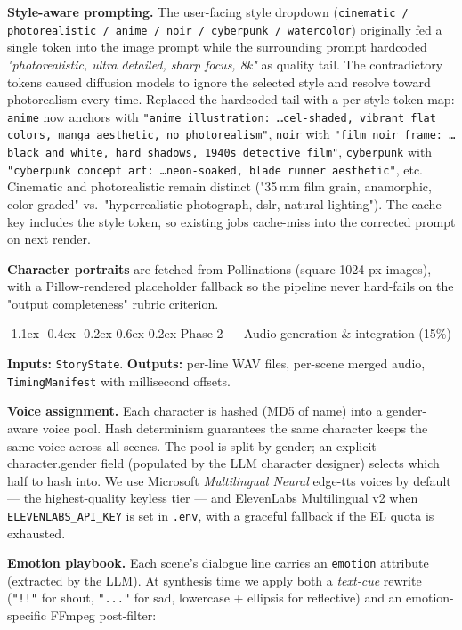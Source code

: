 \documentclass[11pt,a4paper]{article}
\makeatletter
\renewcommand\subsection{\@startsection{subsection}{2}{\z@}%
   {-1.1ex \@plus -0.4ex \@minus -0.2ex}%
   {0.6ex \@plus 0.2ex}%
   {\large\bfseries\color{accent!85!black}}}
\newcommand{\code}[1]{\texttt{\small #1}}
\makeatother
\begin{document}
\textbf{Style-aware prompting.} The user-facing style dropdown
(\code{cinematic / photorealistic / anime / noir / cyberpunk / watercolor})
originally fed a single token into the image prompt while the surrounding
prompt hardcoded \emph{"photorealistic, ultra detailed, sharp focus, 8k"} as
quality tail. The contradictory tokens caused diffusion models to ignore the
selected style and resolve toward photorealism every time. Replaced the
hardcoded tail with a per-style token map: \code{anime} now anchors with
\texttt{"anime illustration: \ldots cel-shaded, vibrant flat colors, manga
aesthetic, no photorealism"}, \code{noir} with \texttt{"film noir frame: \ldots
black and white, hard shadows, 1940s detective film"}, \code{cyberpunk} with
\texttt{"cyberpunk concept art: \ldots neon-soaked, blade runner aesthetic"},
etc. Cinematic and photorealistic remain distinct ("35\,mm film grain,
anamorphic, color graded" vs.\ "hyperrealistic photograph, dslr, natural
lighting"). The cache key includes the style token, so existing jobs cache-miss
into the corrected prompt on next render.

\textbf{Character portraits} are fetched from Pollinations (square 1024 px
images), with a Pillow-rendered placeholder fallback so the pipeline never
hard-fails on the "output completeness" rubric criterion.

\subsection{Phase 2 --- Audio generation \& integration (15\%)}

\textbf{Inputs:} \code{StoryState}.
\textbf{Outputs:} per-line WAV files, per-scene merged audio, \code{TimingManifest}
with millisecond offsets.

\textbf{Voice assignment.} Each character is hashed (MD5 of name) into a
gender-aware voice pool. Hash determinism guarantees the same character keeps
the same voice across all scenes. The pool is split by gender; an explicit
character.gender field (populated by the LLM character designer) selects which
half to hash into. We use Microsoft \emph{Multilingual Neural} edge-tts voices
by default --- the highest-quality keyless tier --- and ElevenLabs Multilingual
v2 when \code{ELEVENLABS\_API\_KEY} is set in \code{.env}, with a graceful
fallback if the EL quota is exhausted.

\textbf{Emotion playbook.} Each scene's dialogue line carries an \code{emotion}
attribute (extracted by the LLM). At synthesis time we apply both a
\emph{text-cue} rewrite (\texttt{"!!"} for shout, \texttt{"..."} for sad,
lowercase + ellipsis for reflective) and an emotion-specific FFmpeg post-filter:
\end{document}
